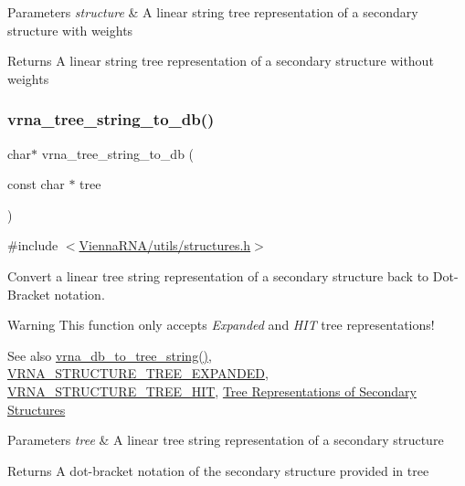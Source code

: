 \begin{DoxyParams}{Parameters}
{\em structure} & A linear string tree representation of a secondary structure with weights \\
\hline
\end{DoxyParams}
\begin{DoxyReturn}{Returns}
A linear string tree representation of a secondary structure without weights 
\end{DoxyReturn}
\mbox{\label{group__struct__utils__tree_ga99d280319a7fd3f87e9f0d8c44520774}} 
\subsubsection{\texorpdfstring{vrna\+\_\+tree\+\_\+string\+\_\+to\+\_\+db()}{vrna\_tree\_string\_to\_db()}}
{\footnotesize\ttfamily char$\ast$ vrna\+\_\+tree\+\_\+string\+\_\+to\+\_\+db (\begin{DoxyParamCaption}\item[{const char $\ast$}]{tree }\end{DoxyParamCaption})}



{\ttfamily \#include $<$\hyperlink{utils_2structures_8h}{Vienna\+R\+N\+A/utils/structures.\+h}$>$}



Convert a linear tree string representation of a secondary structure back to Dot-\/\+Bracket notation. 

\begin{DoxyWarning}{Warning}
This function only accepts {\itshape Expanded} and {\itshape H\+IT} tree representations!
\end{DoxyWarning}
\begin{DoxySeeAlso}{See also}
\hyperlink{group__struct__utils__tree_ga56551ab7da64933a7230d29430f40cfe}{vrna\+\_\+db\+\_\+to\+\_\+tree\+\_\+string()}, \hyperlink{group__struct__utils__tree_gab3b65489d1322da65d3a3e53242307ef}{V\+R\+N\+A\+\_\+\+S\+T\+R\+U\+C\+T\+U\+R\+E\+\_\+\+T\+R\+E\+E\+\_\+\+E\+X\+P\+A\+N\+D\+ED}, \hyperlink{group__struct__utils__tree_ga3ad5609bc93ef20034c3ab989365c1f0}{V\+R\+N\+A\+\_\+\+S\+T\+R\+U\+C\+T\+U\+R\+E\+\_\+\+T\+R\+E\+E\+\_\+\+H\+IT}, \hyperlink{rna_structure_notations_sec_structure_representations_tree}{Tree Representations of Secondary Structures}
\end{DoxySeeAlso}

\begin{DoxyParams}{Parameters}
{\em tree} & A linear tree string representation of a secondary structure \\
\hline
\end{DoxyParams}
\begin{DoxyReturn}{Returns}
A dot-\/bracket notation of the secondary structure provided in {\ttfamily tree} 
\end{DoxyReturn}
